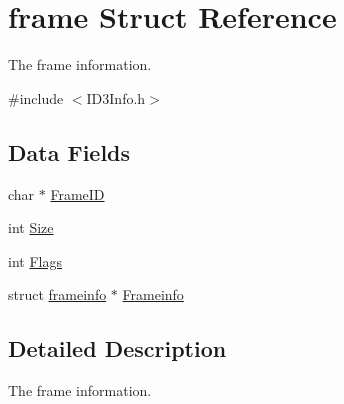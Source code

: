 \hypertarget{structframe}{\section{frame Struct Reference}
\label{structframe}
}


The frame information.  




{\ttfamily \#include $<$I\-D3\-Info.\-h$>$}

\subsection*{Data Fields}
\begin{DoxyCompactItemize}
\item 
char $\ast$ \hyperlink{structframe_a292dfba9fd2b11229258889223baf8b6}{Frame\-I\-D}
\item 
int \hyperlink{structframe_af06eb7b9b70be91dadd4f12ebcaed796}{Size}
\item 
int \hyperlink{structframe_ac3e60a9fc42fb6c0b656191ebb1d658b}{Flags}
\item 
struct \hyperlink{structframeinfo}{frameinfo} $\ast$ \hyperlink{structframe_adcb3be57e379a991d5ee2e4fc382dfd1}{Frameinfo}
\end{DoxyCompactItemize}


\subsection{Detailed Description}
The frame information. 

